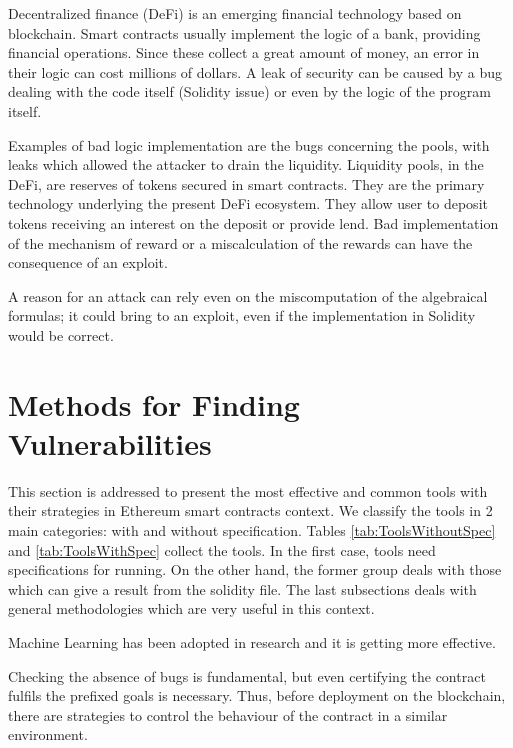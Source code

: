 \documentclass[a4paper,sigconf, language=french,
language=german, language=spanish, language=english]{acmart}
\begin{document}
Decentralized finance (DeFi) is an emerging financial technology based on blockchain. Smart contracts usually implement the logic of a bank, providing financial operations. Since these collect a great amount of money, an error in their logic can cost millions of dollars. A leak of security can be caused by a bug dealing with the code itself (Solidity issue) or even by the logic of the program itself.  

Examples of bad logic implementation are the bugs concerning the pools, with leaks which allowed the attacker to drain the liquidity.
Liquidity pools, in the DeFi, are reserves of tokens secured in smart contracts. They are the primary technology underlying the present DeFi ecosystem. They allow user to deposit tokens receiving an interest on the deposit or provide lend. Bad implementation of the mechanism of reward or a miscalculation of the rewards can have the consequence of an exploit. 

A reason for an attack can rely even on the miscomputation of the algebraical formulas; it could bring to an exploit, even if the implementation in Solidity would be correct.


\section{Methods for Finding Vulnerabilities}
\label{MethodologiesForTools}
This section is addressed to present the most effective and common tools with their strategies in Ethereum smart contracts context. 
We classify the tools in 2 main categories: with and without specification. Tables \ref{tab:ToolsWithoutSpec} and \ref{tab:ToolsWithSpec} collect the tools. 
In the first case, tools need specifications for running. On the other hand,  the former group 
deals with those which can give a result from the solidity file.
The last subsections deals with general methodologies which are very useful in this context. 

Machine Learning has been adopted in research and it is getting more effective. 

Checking the absence of bugs is fundamental, but even certifying the contract fulfils the prefixed goals is necessary. Thus, before deployment on the blockchain, there are strategies to control the behaviour of the contract in a similar environment.
\end{document}
